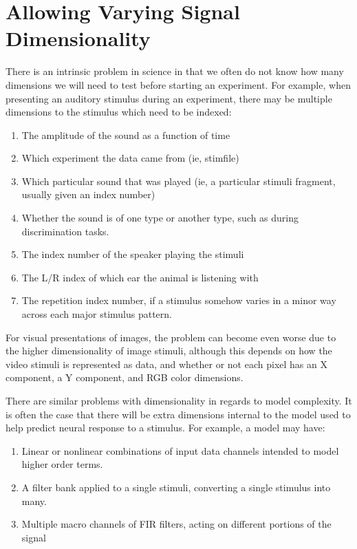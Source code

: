 \documentclass{article}
\begin{document}
\section{Allowing Varying Signal Dimensionality}

There is an intrinsic problem in science in that we often do not know how many dimensions we will need to test before starting an experiment. For example, when presenting an auditory stimulus during an experiment, there may be multiple dimensions to the stimulus which need to be indexed:

\begin{enumerate}
\item The amplitude of the sound as a function of time
\item Which experiment the data came from (ie, stimfile)
\item Which particular sound that was played (ie, a particular stimuli fragment, usually given an index number)
\item Whether the sound is of one type or another type, such as during discrimination tasks. 
\item The index number of the speaker playing the stimuli
\item The L/R index of which ear the animal is listening with
\item The repetition index number, if a stimulus somehow varies in a minor way across each major stimulus pattern.
\end{enumerate}

For visual presentations of images, the problem can become even worse due to the higher dimensionality of image stimuli, although this depends on how the video stimuli is represented as data, and whether or not each pixel has an X component, a Y component, and RGB color dimensions. 

There are similar problems with dimensionality in regards to model complexity. It is often the case that there will be extra dimensions internal to the model used to help predict neural response to a stimulus. For example, a model may have:

\begin{enumerate}
\item Linear or nonlinear combinations of input data channels intended to model higher order terms. 
\item A filter bank applied to a single stimuli, converting a single stimulus into many.
\item Multiple macro channels of FIR filters, acting on different portions of the signal 
\end{enumerate}
\end{document}
